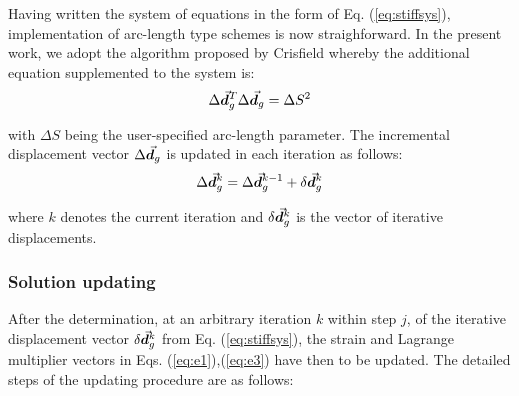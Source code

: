 Having written the system of equations in the form of Eq. (\ref{eq:stiffsys}),
implementation of arc-length type schemes is now straighforward. In the
present
work, we adopt the algorithm proposed by Crisfield \cite{Crisfield3} whereby
the additional equation supplemented to the system is:
\begin{gather}
	\Delta\vec{\boldsymbol{d}}_g^T\Delta\vec{\boldsymbol{d}}_g = \Delta S^2
\end{gather}

\noindent with $\Delta S$ being the user-specified arc-length parameter. The
incremental displacement vector $\Delta\vec{\boldsymbol{d}}_g$ is updated in each iteration
as follows:
\begin{gather}
	\Delta\vec{\boldsymbol{d}}_g^{k} = \Delta\vec{\boldsymbol{d}}_g^{k-1} + \delta\vec{\boldsymbol{d}}_g^{k}
\end{gather}

\noindent where $k$ denotes the current iteration and
$\delta\vec{\boldsymbol{d}}_g^{k}$ is the vector of iterative displacements.

\subsubsection{Solution updating}\label{subsection:CH2-S4SS4}

After the determination, at an arbitrary iteration $k$ within
step $j$, of the iterative
displacement vector $\delta\vec{\boldsymbol{d}}_g^k$ from Eq. (\ref{eq:stiffsys}), the 
strain
and Lagrange multiplier vectors in Eqs. (\ref{eq:e1}),(\ref{eq:e3}) have
then to be updated.  The detailed steps of the updating procedure are as
follows:

\vspace{0.4cm}

